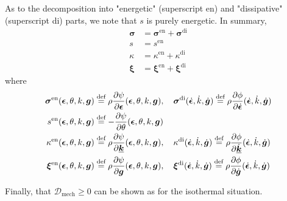 As to the decomposition into "energetic" (superscript en) and "dissipative" (superscript di) parts, we note that $s$ is purely energetic. In summary,
\begin{subequations}\label{eq:8-419}
    \begin{align}
    \bm{\sigma} &= \bm{\sigma}^{\mathrm{en}} + \bm{\sigma}^{\mathrm{di}}
\label{eq:8-419a}\\
    s &= s^{\mathrm{en}}
\label{eq:8-419b}\\
    \kappa &= \kappa^{\mathrm{en}} + \kappa^{\mathrm{di}}
\label{eq:8-419c}\\
    \bm{\xi} &= \bm{\xi}^{\mathrm{en}} + \bm{\xi}^{\mathrm{di}}
\label{eq:8-419c}
    \end{align}
\end{subequations}
where
\begin{subequations}\label{eq:8-219}
    \begin{align}
    \bm{\sigma}^{\mathrm{en}}(\bm{\epsilon},\theta,k,\bm{g}) &\stackrel{\text{def}}{=} \rho\frac{\partial \psi}{\partial \bm{\epsilon}}(\bm{\epsilon},\theta,k,\bm{g}), \quad
    \bm{\sigma}^{\mathrm{di}}(\dot{\bm{\epsilon}},\dot{k},\dot{\bm{g}}) \stackrel{\text{def}}{=} \rho\frac{\partial \phi}{\partial \dot{\bm{\epsilon}}}(\dot{\bm{\epsilon}},\dot{k},\dot{\bm{g}})
\label{eq:8-219a}\\
    s^{\mathrm{en}}(\bm{\epsilon},\theta,k,\bm{g}) &\stackrel{\text{def}}{=} -\frac{\partial \psi}{\partial \theta}(\bm{\epsilon},\theta,k,\bm{g})
\label{eq:8-219b}\\
    \kappa^{\mathrm{en}}(\bm{\epsilon},\theta,k,\bm{g}) &\stackrel{\text{def}}{=} \rho\frac{\partial \psi}{\partial \underline{\mbox{\boldmath $k$}}}(\bm{\epsilon},\theta,k,\bm{g}), \quad
    \kappa^{\mathrm{di}}(\dot{\bm{\epsilon}},\dot{k},\dot{\bm{g}}) \stackrel{\text{def}}{=} \rho\frac{\partial \phi}{\partial \dot{\underline{\mbox{\boldmath $k$}}}}(\dot{\bm{\epsilon}},\dot{k},\dot{\bm{g}})
\label{eq:8-219c}\\
    \bm{\xi}^{\mathrm{en}}(\bm{\epsilon},\theta,k,\bm{g}) &\stackrel{\text{def}}{=} \rho\frac{\partial \psi}{\partial \bm{g}}(\bm{\epsilon},\theta,k,\bm{g}), \quad
    \bm{\xi}^{\mathrm{di}}(\dot{\bm{\epsilon}},\dot{k},\dot{\bm{g}}) \stackrel{\text{def}}{=} \rho\frac{\partial \phi}{\partial \dot{\bm{g}}}(\dot{\bm{\epsilon}},\dot{k},\dot{\bm{g}})
\label{eq:8-219d}
    \end{align}
\end{subequations}

Finally, that ${\mathcal D}_{\mathrm{mech}}\geq 0$ can be shown as for the isothermal situation.




















